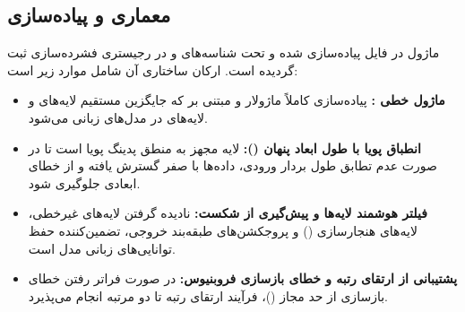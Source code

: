 \subsection{معماری و پیاده‌سازی}
ماژول  در فایل  پیاده‌سازی شده و تحت شناسه‌های  و  در رجیستری فشرده‌سازی ثبت گردیده است. ارکان ساختاری آن شامل موارد زیر است:
\begin{itemize}
    \item \textbf{ماژول خطی :} پیاده‌سازی کاملاً ماژولار و مبتنی بر  که جایگزین مستقیم لایه‌های  و لایه‌های  در مدل‌های زبانی می‌شود.
    \item \textbf{انطباق پویا با طول ابعاد پنهان ():} لایه مجهز به منطق پدینگ پویا است تا در صورت عدم تطابق طول بردار ورودی، داده‌ها با صفر گسترش یافته و از خطای ابعادی جلوگیری شود.
    \item \textbf{فیلتر هوشمند لایه‌ها و پیش‌گیری از شکست:} نادیده گرفتن لایه‌های غیرخطی، لایه‌های هنجارسازی () و پروجکشن‌های طبقه‌بند خروجی، تضمین‌کننده حفظ توانایی‌های زبانی مدل است.
    \item \textbf{پشتیبانی از ارتقای رتبه و خطای بازسازی فروبنیوس:} در صورت فراتر رفتن خطای بازسازی از حد مجاز ()، فرآیند ارتقای رتبه تا دو مرتبه انجام می‌پذیرد.
\end{itemize}
